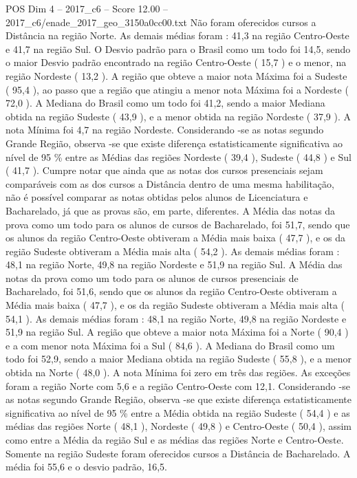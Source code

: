\begin{textsample}{POS Dim 4 – 2017\_c6 – Score 12.00 – 2017\_c6/enade\_2017\_geo\_3150a0cc00.txt}
Não foram oferecidos cursos a Distância na região Norte.
As demais médias foram : 41,3 na região Centro-Oeste e 41,7 na região Sul.
O Desvio padrão para o Brasil como um todo foi 14,5, sendo o maior Desvio padrão encontrado na região Centro-Oeste ( 15,7 ) e o menor, na região Nordeste ( 13,2 ).
A região que obteve a maior nota Máxima foi a Sudeste ( 95,4 ), ao passo que a região que atingiu a menor nota Máxima foi a Nordeste ( 72,0 ).
A Mediana do Brasil como um todo foi 41,2, sendo a maior Mediana obtida na região Sudeste ( 43,9 ), e a menor obtida na região Nordeste ( 37,9 ).
A nota Mínima foi 4,7 na região Nordeste.
Considerando -se as notas segundo Grande Região, observa -se que existe diferença estatisticamente significativa ao nível de 95 \% entre as Médias das regiões Nordeste ( 39,4 ), Sudeste ( 44,8 ) e Sul ( 41,7 ).
Cumpre notar que ainda que as notas dos cursos presenciais sejam comparáveis com as dos cursos a Distância dentro de uma mesma habilitação, não é possível comparar as notas obtidas pelos alunos de Licenciatura e Bacharelado, já que as provas são, em parte, diferentes.
A Média das notas da prova como um todo para os alunos de cursos de Bacharelado, foi 51,7, sendo que os alunos da região Centro-Oeste obtiveram a Média mais baixa ( 47,7 ), e os da região Sudeste obtiveram a Média mais alta ( 54,2 ).
As demais médias foram : 48,1 na região Norte, 49,8 na região Nordeste e 51,9 na região Sul.
A Média das notas da prova como um todo para os alunos de cursos presenciais de Bacharelado, foi 51,6, sendo que os alunos da região Centro-Oeste obtiveram a Média mais baixa ( 47,7 ), e os da região Sudeste obtiveram a Média mais alta ( 54,1 ).
As demais médias foram : 48,1 na região Norte, 49,8 na região Nordeste e 51,9 na região Sul.
A região que obteve a maior nota Máxima foi a Norte ( 90,4 ) e a com menor nota Máxima foi a Sul ( 84,6 ).
A Mediana do Brasil como um todo foi 52,9, sendo a maior Mediana obtida na região Sudeste ( 55,8 ), e a menor obtida na Norte ( 48,0 ).
A nota Mínima foi zero em três das regiões.
As exceções foram a região Norte com 5,6 e a região Centro-Oeste com 12,1.
Considerando -se as notas segundo Grande Região, observa -se que existe diferença estatisticamente significativa ao nível de 95 \% entre a Média obtida na região Sudeste ( 54,4 ) e as médias das regiões Norte ( 48,1 ), Nordeste ( 49,8 ) e Centro-Oeste ( 50,4 ), assim como entre a Média da região Sul e as médias das regiões Norte e Centro-Oeste.
Somente na região Sudeste foram oferecidos cursos a Distância de Bacharelado.
A média foi 55,6 e o desvio padrão, 16,5.

\end{textsample}
